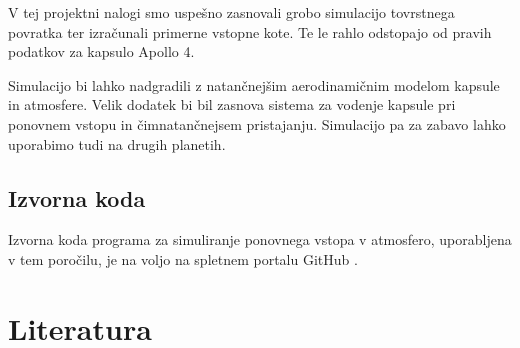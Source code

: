 \documentclass[11pt,a4paper]{article}
\begin{document}
V tej projektni nalogi smo uspe\v sno zasnovali grobo simulacijo tovrstnega povratka ter izra\v cunali primerne vstopne kote. Te le rahlo odstopajo od pravih podatkov za kapsulo Apollo 4.

Simulacijo bi lahko nadgradili z natan\v cnej\v sim aerodinami\v cnim modelom kapsule in atmosfere. Velik dodatek bi bil zasnova sistema za vodenje kapsule pri ponovnem vstopu in \v cimnatan\v cnejsem pristajanju. Simulacijo pa za zabavo lahko uporabimo tudi na drugih planetih.


%

\vspace{2cm}


\clearpage

\begin{appendices}
	\section{Izvorna koda}
	Izvorna koda programa za simuliranje ponovnega vstopa v atmosfero, uporabljena v tem poro\v cilu, je na voljo na spletnem portalu GitHub \cite{github-source-code}.
\end{appendices}
\clearpage
\section{Literatura}
\printbibliography[heading=none]
\end{document}
